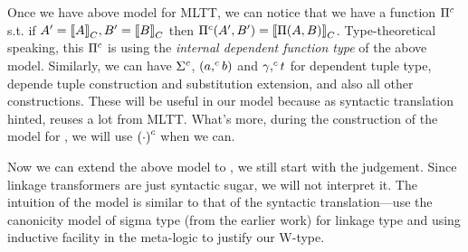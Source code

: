 Once we have above model for MLTT, we can notice that we have a function ${\Pi}^c$ s.t. if $A' = {{\llbracket {A} \rrbracket}_C}, B' = {{\llbracket {B} \rrbracket}_C}$ then $\Pi^c({A'},{B'}) = {{\llbracket {\ensuremath{\Pi({A},{B})}} \rrbracket}_C}$. Type-theoretical speaking, this ${\Pi}^c$ is using the \emph{internal dependent function type} of the above model. Similarly, we can have ${\Sigma}^c$, $({a},^c{b})$  and ${\gamma},^c{t}$  for dependent tuple type, depende tuple construction and substitution extension, and also all other constructions. These will be useful in our \TT model because as syntactic translation hinted, \TT reuses a lot from MLTT. What's more, during the construction of the model for \TT, we will use ${(\cdot)}^c$ when we can.

Now we can extend the above model to \TT , we still start with the judgement. Since linkage transformers are just syntactic sugar, we will not interpret it.
The intuition of the model is similar to that of the syntactic translation---use the canonicity model of sigma type (from the earlier work) for linkage type and using inductive facility in the meta-logic to justify our W-type. 

